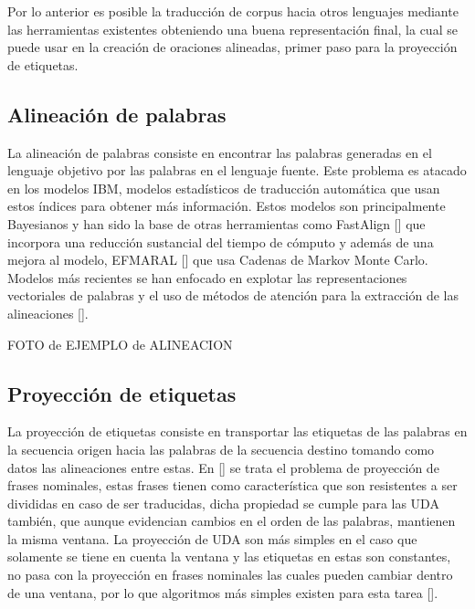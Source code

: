Por lo anterior es posible la traducción de corpus hacia otros lenguajes mediante las
herramientas existentes obteniendo una buena representación final, la cual se puede usar en la creación de
oraciones alineadas, primer paso para la proyección de etiquetas.

\subsection{Alineación de palabras}

La alineación de palabras consiste en encontrar las palabras generadas en el lenguaje objetivo por las 
palabras en el lenguaje fuente.
Este problema es atacado en los modelos IBM, modelos estadísticos de traducción automática que usan estos 
índices para obtener más información. Estos modelos son principalmente Bayesianos y han sido la base de
otras herramientas como FastAlign [\cite{dyer2013fastalign}] que incorpora una reducción sustancial del
tiempo de cómputo y además de una mejora al modelo, EFMARAL [\cite{ostling2016efficient}] que usa
Cadenas de Markov Monte Carlo. Modelos más recientes se han enfocado en explotar las representaciones
vectoriales de palabras y el uso de métodos de atención para la extracción de las
alineaciones [\cite{dou2021word}].

FOTO de EJEMPLO de ALINEACION

\subsection{Proyección de etiquetas}

La proyección de etiquetas consiste en transportar las etiquetas de las palabras en la secuencia origen
hacia las palabras de la secuencia destino tomando como datos las alineaciones entre estas. En [\cite{yarowsky2001inducing}]
se trata el problema de proyección de frases nominales, estas frases tienen como característica que son resistentes
a ser divididas en caso de ser traducidas, dicha propiedad se cumple para las UDA también, que aunque evidencian 
cambios en el orden de las palabras, mantienen la misma ventana. La proyección de UDA son más simples en el caso
que solamente se tiene en cuenta la ventana y las etiquetas en estas son constantes, no pasa con la proyección en
frases nominales las cuales pueden cambiar dentro de una ventana, por lo que algoritmos más simples existen
para esta tarea [\cite{eger2018cross}].
